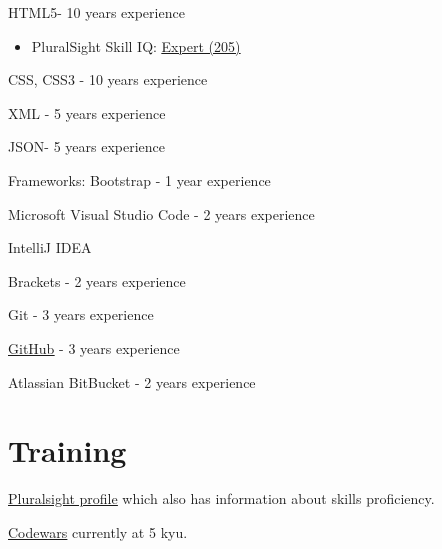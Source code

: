\documentclass[]{deedy-resume-openfont}
\begin{document}
\descript{}
\begin{tightemize}
\item HTML5\footnotemark[\value{footnote}] - 10 years experience
\begin{itemize}
\item PluralSight Skill IQ: \href{https://app.pluralsight.com/profile/alexander-koik-cesto}{\underline{Expert (205)}}
\end{itemize}
\item CSS\footnotemark[\value{footnote}], CSS3 - 10 years experience
\item XML - 5 years experience
\item JSON\footnotemark[\value{footnote}] - 5 years experience
\item Frameworks: Bootstrap - 1 year experience
\end{tightemize}
\sectionsep

\descript{}
\begin{tightemize}
\item Microsoft Visual Studio Code - 2 years experience
\item IntelliJ IDEA
\item Brackets - 2 years experience
\end{tightemize}
\sectionsep

\descript{}
\begin{tightemize}
\item Git - 3 years experience
\item \href{https://github.com/sirkoik}{\underline{GitHub}} - 3 years experience
\item Atlassian BitBucket - 2 years experience
\end{tightemize}
\sectionsep


\newpage

\section{Training}
\descript{}
\begin{tightemize}
\item \href{https://app.pluralsight.com/profile/alexander-koik-cesto}{\underline{Pluralsight profile}} which also has information about skills proficiency.
\item \href{https://www.codewars.com/users/sirkoik}{\underline{Codewars}} currently at 5 kyu.
\end{tightemize}
\sectionsep
\end{document}
